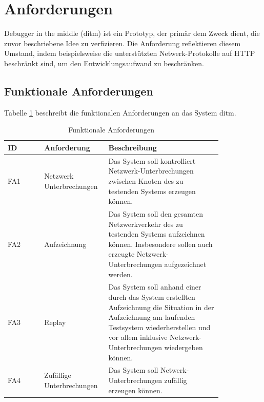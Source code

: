 \documentclass[12pt,a4paper]{report}
\begin{document}
\section{Anforderungen}
Debugger in the middle (ditm) ist ein Prototyp, der primär dem Zweck dient, die zuvor beschriebene Idee zu verfizieren.
Die Anforderung reflektieren diesem Umstand, indem beispielsweise die unterstützten Netwerk-Protokolle auf HTTP beschränkt sind,
um den Entwicklungsaufwand zu beschränken.

\subsection{Funktionale Anforderungen}
Tabelle \ref{tab:fa} beschreibt die funktionalen Anforderungen an das System ditm.
\begin{longtable}[H]{|p{}|p{0.3\linewidth}|p{0.53\linewidth}|}
	\caption{Funktionale Anforderungen\label{tab:fa}}                                                                                                                                                                                                            \\
	\hline
	ID   & Anforderung                   & Beschreibung                                                                                                                                                                                                          \\ \hline
	FA1  & Netzwerk Unterbrechungen      & Das System soll kontrolliert Netzwerk-Unterbrechungen zwischen Knoten des zu testenden Systems erzeugen können.                                                                                                       \\ \hline
	FA2  & Aufzeichnung                  & Das System soll den gesamten Netzwerkverkehr des zu testenden Systems aufzeichnen können. Insbesondere sollen auch erzeugte Netzwerk-Unterbrechungen aufgezeichnet werden.                                            \\ \hline
	FA3  & Replay                        & Das System soll anhand einer durch das System erstellten Aufzeichnung die Situation in der Aufzeichnung am laufenden Testsystem wiederherstellen und vor allem inklusive Netzwerk-Unterbrechungen wiedergeben können. \\ \hline
	FA4  & Zufällige Unterbrechungen     & Das System soll Netwerk-Unterbrechungen zufällig erzeugen können.                                                                                                                                                     \\ \hline

\end{longtable}
\end{document}
